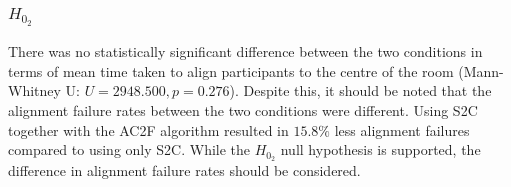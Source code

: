 \subsubsection{$H_{0_2}$}
There was no statistically significant difference between the two conditions in terms of mean time taken to align participants to the centre of the room (Mann-Whitney U: $U = 2948.500, p = 0.276$). Despite this, it should be noted that the alignment failure rates between the two conditions were different. Using S2C together with the AC2F algorithm resulted in $15.8\%$ less alignment failures compared to using only S2C. While the $H_{0_2}$ null hypothesis is supported, the difference in alignment failure rates should be considered.